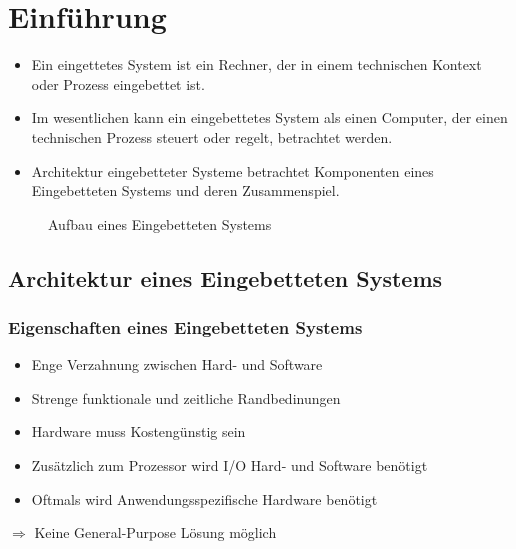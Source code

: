 \chapter{Einführung}
\begin{itemize}
    \item Ein eingettetes System ist ein Rechner, der in einem technischen Kontext oder Prozess eingebettet ist.
    \item Im wesentlichen kann ein eingebettetes System als einen Computer, der einen technischen Prozess steuert oder regelt, betrachtet werden.
    \item Architektur eingebetteter Systeme betrachtet Komponenten eines Eingebetteten Systems und
deren Zusammenspiel.
\end{itemize}

\begin{figure}[H]
    \centering
    \caption{Aufbau eines Eingebetteten Systems}
\end{figure}

\section{Architektur eines Eingebetteten Systems}
\subsection{Eigenschaften eines Eingebetteten Systems}
\begin{itemize}
    \item Enge Verzahnung zwischen Hard- und Software
    \item Strenge funktionale und zeitliche Randbedinungen
    \item Hardware muss Kostengünstig sein
    \item Zusätzlich zum Prozessor wird I/O Hard- und Software benötigt
    \item Oftmals wird Anwendungsspezifische Hardware benötigt
\end{itemize}
$\Rightarrow$ Keine \glqq{}General-Purpose\grqq{} Lösung möglich

